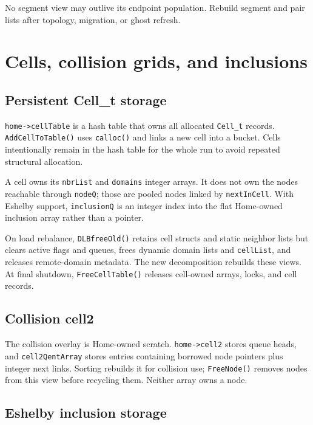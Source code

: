 \documentclass[11pt]{article}
\newcommand{\code}[1]{\texorpdfstring{\nolinkurl{#1}}{#1}}
\begin{document}
No segment view may outlive its endpoint population.  Rebuild segment and
pair lists after topology, migration, or ghost refresh.

\section{Cells, collision grids, and inclusions}

\subsection{Persistent Cell\_t storage}



\code{home->cellTable} is a hash table that owns all allocated
\code{Cell_t} records.  \code{AddCellToTable()} uses \code{calloc()} and
links a new cell into a bucket.  Cells intentionally remain in the hash table
for the whole run to avoid repeated structural allocation.

A cell owns its \code{nbrList} and \code{domains} integer arrays.  It does not
own the nodes reachable through \code{nodeQ}; those are pooled nodes linked by
\code{nextInCell}.  With Eshelby support, \code{inclusionQ} is an integer
index into the flat Home-owned inclusion array rather than a pointer.

On load rebalance, \code{DLBfreeOld()} retains cell structs and static
neighbor lists but clears active flags and queues, frees dynamic domain lists
and \code{cellList}, and releases remote-domain metadata.  The new
decomposition rebuilds these views.  At final shutdown,
\code{FreeCellTable()} releases cell-owned arrays, locks, and cell records.

\subsection{Collision cell2}

The collision overlay is Home-owned scratch.  \code{home->cell2} stores queue
heads, and \code{cell2QentArray} stores entries containing borrowed node
pointers plus integer next links.  Sorting rebuilds it for collision use;
\code{FreeNode()} removes nodes from this view before recycling them.  Neither
array owns a node.

\subsection{Eshelby inclusion storage}
\end{document}
